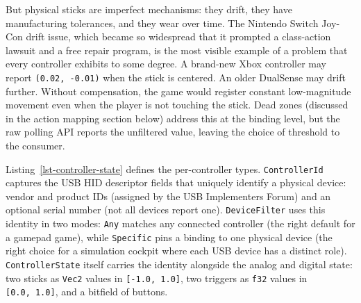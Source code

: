 \documentclass[
  11pt,
  letterpaper,
  DIV=11,
  numbers=noendperiod,
  twoside,
  open=right]{scrreprt}
\begin{document}
But physical sticks are imperfect mechanisms: they drift, they have
manufacturing tolerances, and they wear over time. The Nintendo Switch
Joy-Con drift issue, which became so widespread that it prompted a
class-action lawsuit and a free repair program, is the most visible
example of a problem that every controller exhibits to some degree. A
brand-new Xbox controller may report \texttt{(0.02,\ -0.01)} when the
stick is centered. An older DualSense may drift further. Without
compensation, the game would register constant low-magnitude movement
even when the player is not touching the stick. Dead zones (discussed in
the action mapping section below) address this at the binding level, but
the raw polling API reports the unfiltered value, leaving the choice of
threshold to the consumer.

Listing~\ref{lst-controller-state} defines the per-controller types.
\texttt{ControllerId} captures the USB HID descriptor fields that
uniquely identify a physical device: vendor and product IDs (assigned by
the USB Implementers Forum) and an optional serial number (not all
devices report one). \texttt{DeviceFilter} uses this identity in two
modes: \texttt{Any} matches any connected controller (the right default
for a gamepad game), while \texttt{Specific} pins a binding to one
physical device (the right choice for a simulation cockpit where each
USB device has a distinct role). \texttt{ControllerState} itself carries
the identity alongside the analog and digital state: two sticks as
\texttt{Vec2} values in \texttt{{[}-1.0,\ 1.0{]}}, two triggers as
\texttt{f32} values in \texttt{{[}0.0,\ 1.0{]}}, and a bitfield of
buttons.
\end{document}
